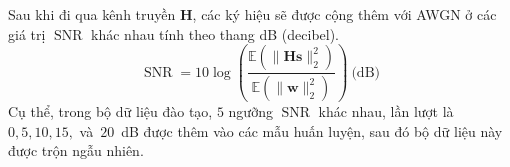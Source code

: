 
Sau khi đi qua kênh truyền $\mathbf{H}$, các ký hiệu sẽ được cộng thêm với AWGN ở các giá trị $\operatorname{SNR}$ khác nhau tính theo thang dB (decibel). 
\begin{equation}
\operatorname{SNR} = 10 \log \left(\frac{\mathbb{E}\left(\|\mathbf{H s}\|_2^2\right)}{\mathbb{E}\left(\|\mathbf{w}\|_2^2\right)}\right)~\text{(dB)}
\end{equation}
Cụ thể, trong bộ dữ liệu đào tạo, $5$ ngưỡng $\operatorname{SNR}$ khác nhau, lần lượt là $0, 5, 10, 15,$ và~$20$~dB được thêm vào các mẫu huấn luyện, sau đó bộ dữ liệu này được trộn ngẫu nhiên.

